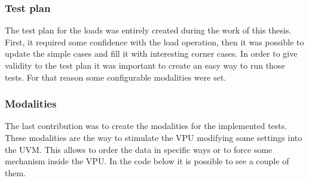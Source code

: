 \subsubsection{Test plan}
The test plan for the loads was entirely created during the work of this thesis. First, it required some confidence with the load operation, then it was possible to update the simple cases and fill it with interesting corner cases.
In order to give validity to the test plan it was important to create an easy way to run those tests. For that reason some configurable modalities were set.


\subsubsection{Modalities}
The last contribution was to create the modalities for the implemented tests. These modalities are the way to stimulate the VPU modifying some settings into the UVM. This allows to order the data in specific ways or to force some mechanism inside the VPU. In the code below it is possible to see a couple of them.

